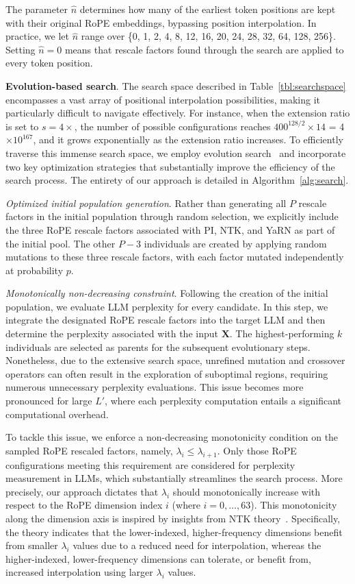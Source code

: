 The parameter $\hat{n}$ determines how many of the earliest token positions are kept with their original RoPE embeddings, bypassing position interpolation. In practice, we let $\hat{n}$ range over \{0, 1, 2, 4, 8, 12, 16, 20, 24, 28, 32, 64, 128, 256\}. Setting $\hat{n}=0$ means that rescale factors found through the search are applied to every token position.

\textbf{Evolution-based search}. The search space described in Table~\ref{tbl:searchspace} encompasses a vast array of positional interpolation possibilities, making it particularly difficult to navigate effectively. For instance, when the extension ratio is set to $s=4\times$, the number of possible configurations reaches $400^{128/2}\times14$ = 4$\times10^{167}$, and it grows exponentially as the extension ratio increases. To efficiently traverse this immense search space, we employ evolution search~\cite{guo2020single} and incorporate two key optimization strategies that substantially improve the efficiency of the search process. The entirety of our approach is detailed in Algorithm~\ref{alg:search}.

\textit{Optimized initial population generation}. Rather than generating all $P$ rescale factors in the initial population through random selection, we explicitly include the three RoPE rescale factors associated with PI, NTK, and YaRN as part of the initial pool. The other $P-3$ individuals are created by applying random mutations to these three rescale factors, with each factor mutated independently at probability $p$.

\textit{Monotonically non-decreasing constraint}. Following the creation of the initial population, we evaluate LLM perplexity for every candidate. In this step, we integrate the designated RoPE rescale factors into the target LLM and then determine the perplexity associated with the input $\mathbf{X}$. The highest-performing $k$ individuals are selected as parents for the subsequent evolutionary steps. Nonetheless, due to the extensive search space, unrefined mutation and crossover operators can often result in the exploration of suboptimal regions, requiring numerous unnecessary perplexity evaluations. This issue becomes more pronounced for large $L'$, where each perplexity computation entails a significant computational overhead.

To tackle this issue, we enforce a non-decreasing monotonicity condition on the sampled RoPE rescaled factors, namely, $\lambda_i\le \lambda_{i+1}$. Only those RoPE configurations meeting this requirement are considered for perplexity measurement in LLMs, which substantially streamlines the search process. More precisely, our approach dictates that $\lambda_i$ should monotonically increase with respect to the RoPE dimension index $i$ (where $i=0,\ldots,63$). This monotonicity along the dimension axis is inspired by insights from NTK theory~\cite{jacot2018neural,tancik2020fourier,ntk}. Specifically, the theory indicates that the lower-indexed, higher-frequency dimensions benefit from smaller $\lambda_i$ values due to a reduced need for interpolation, whereas the higher-indexed, lower-frequency dimensions can tolerate, or benefit from, increased interpolation using larger $\lambda_i$ values.

